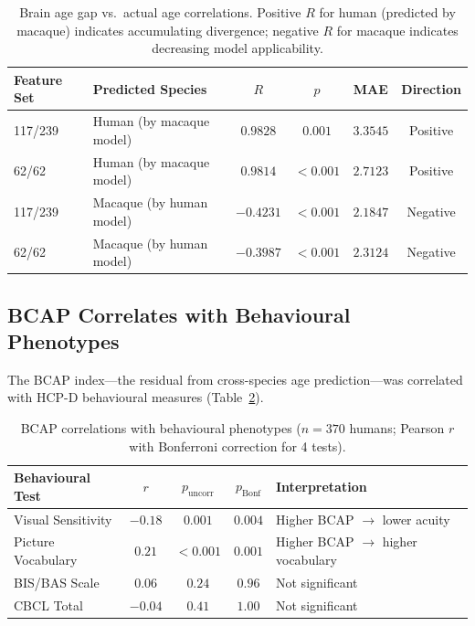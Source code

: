 \documentclass[11pt]{article}
\begin{document}
\begin{table}[H]
\centering
\caption{Brain age gap vs.\ actual age correlations. Positive $R$ for human (predicted by macaque) indicates accumulating divergence; negative $R$ for macaque indicates decreasing model applicability.}
\label{tab:gap}
\begin{tabular}{llcccc}
\toprule
Feature Set & Predicted Species & $R$ & $p$ & MAE & Direction \\
\midrule
117/239 & Human (by macaque model) & $\mathbf{0.9828}$ & $0.001$ & $3.3545$ & Positive \\
62/62 & Human (by macaque model) & $\mathbf{0.9814}$ & $< 0.001$ & $2.7123$ & Positive \\
117/239 & Macaque (by human model) & $-0.4231$ & $< 0.001$ & $2.1847$ & Negative \\
62/62 & Macaque (by human model) & $-0.3987$ & $< 0.001$ & $2.3124$ & Negative \\
\bottomrule
\end{tabular}
\end{table}

\subsection{BCAP Correlates with Behavioural Phenotypes}

The BCAP index---the residual from cross-species age prediction---was correlated with HCP-D behavioural measures (Table~\ref{tab:bcap_behav}).

\begin{table}[H]
\centering
\caption{BCAP correlations with behavioural phenotypes ($n = 370$ humans; Pearson $r$ with Bonferroni correction for 4 tests).}
\label{tab:bcap_behav}
\begin{tabular}{lcccl}
\toprule
Behavioural Test & $r$ & $p_{\mathrm{uncorr}}$ & $p_{\mathrm{Bonf}}$ & Interpretation \\
\midrule
Visual Sensitivity & $-0.18$ & $0.001$ & $\mathbf{0.004}$ & Higher BCAP $\to$ lower acuity \\
Picture Vocabulary & $0.21$ & $< 0.001$ & $\mathbf{0.001}$ & Higher BCAP $\to$ higher vocabulary \\
BIS/BAS Scale & $0.06$ & $0.24$ & $0.96$ & Not significant \\
CBCL Total & $-0.04$ & $0.41$ & $1.00$ & Not significant \\
\bottomrule
\end{tabular}
\end{table}
\end{document}
